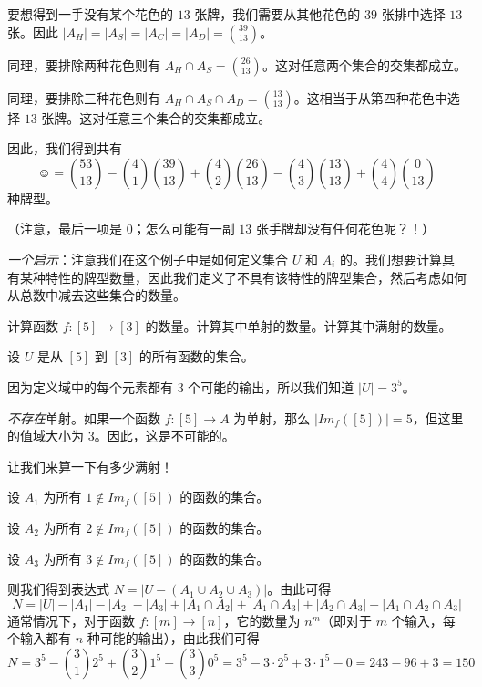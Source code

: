 \begin{example}[桥牌]
    要想得到一手没有某个花色的 $13$ 张牌，我们需要从其他花色的 $39$ 张排中选择 $13$ 张。因此 $|A_H| = |A_S| = |A_C| = |A_D| = {39 \choose 13}$。

    同理，要排除两种花色则有 $A_H \cap A_S = {26 \choose 13}$。这对任意两个集合的交集都成立。

    同理，要排除三种花色则有 $A_H \cap A_S \cap A_D = {13 \choose 13}$。这相当于从第四种花色中选择 $13$ 张牌。这对任意三个集合的交集都成立。

    因此，我们得到共有
    \[\smiley{} = {53 \choose 13}-{4 \choose 1}{39 \choose 13}+{4 \choose 2}{26 \choose 13}-{4 \choose 3}{13 \choose 13}+{4 \choose 4}{0 \choose 13}\]
    种牌型。

    （注意，最后一项是 $0$；怎么可能有一副 $13$ 张手牌却没有任何花色呢？！）

    \emph{一个启示}：注意我们在这个例子中是如何定义集合 $U$ 和 $A_i$ 的。我们想要计算具有某种特性的牌型数量，因此我们定义了不具有该特性的牌型集合，然后考虑如何从总数中减去这些集合的数量。
\end{example}

\begin{example}[满射计数]

    计算函数 $f:[5] \to [3]$ 的数量。计算其中单射的数量。计算其中满射的数量。

    设 $U$ 是从 $[5]$ 到 $[3]$ 的所有函数的集合。

    因为定义域中的每个元素都有 $3$ 个可能的输出，所以我们知道 $|U| = 3^5$。

    \emph{不存在}单射。如果一个函数 $f : [5] \to A$ 为单射，那么 $|Im_f ([5])| = 5$，但这里的值域大小为 $3$。因此，这是不可能的。

    让我们来算一下有多少满射！

    设 $A_1$ 为所有 $1 \notin Im_f ([5])$ 的函数的集合。

    设 $A_2$ 为所有 $2 \notin Im_f ([5])$ 的函数的集合。

    设 $A_3$ 为所有 $3 \notin Im_f ([5])$ 的函数的集合。

    则我们得到表达式 $N = |U - (A_1 \cup A_2 \cup A_3)|$。由此可得
    \[N = |U| - |A_1| - |A_2| - |A_3| + |A_1 \cap A_2| + |A_1 \cap A_3| + |A_2 \cap A_3| - |A_1 \cap A_2 \cap A_3|\]
    通常情况下，对于函数 $f : [m] \to [n]$，它的数量为 $n^m$（即对于 $m$ 个输入，每个输入都有 $n$ 种可能的输出），由此我们可得
    \[N=3^5-{3 \choose 1}2^5+{3 \choose 2}1^5-{3 \choose 3}0^5=3^5-3 \cdot 2^5 + 3 \cdot 1^5 - 0 = 243 - 96 + 3 = 150\]
\end{example}

